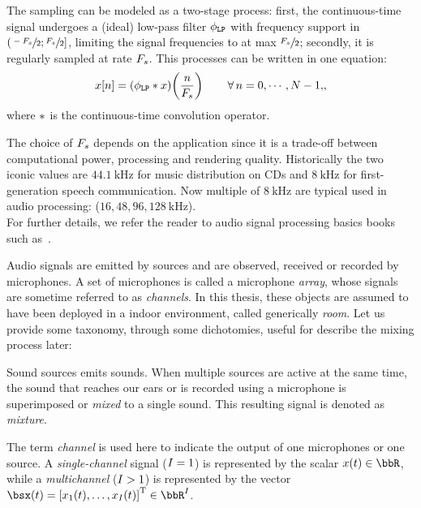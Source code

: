 The sampling can be modeled as a two-stage process:
first, the continuous-time signal undergoes a (ideal) low-pass filter $\phi_\mathtt{LP}$ with frequency support in $\kintervoc{\sfrac{-\Fs}{2}}{\sfrac{\Fs}{2}}$, limiting the signal frequencies to at max $\sfrac{F_s}{2}$;
secondly, it is regularly sampled at rate $F_s$.
This processes can be written in one equation:
\begin{equation}
    x[n] = (\lowpassfilter \conv x)\kparen{\frac{n}{\Fs}}
    \mathspace
    \kforall[n = 0, \cdots, N-1]
    ,
\end{equation}
where $\ast$ is the continuous-time convolution operator.

The choice of $F_s$ depends on the application since it is a trade-off between computational power, processing and rendering quality.
Historically the two iconic values are $\SI{44.1}{\kHz}$ for music distribution on CDs and $\SI{8}{\kHz}$ for first-generation speech communication.
Now multiple of $\SI{8}{\kHz}$ are typical used in audio processing: ($16, 48, 96, \SI{128}{\kHz}$).
\\For further details, we refer the reader to audio signal processing basics books such as~.

\mynewline
Audio signals are emitted by sources and are observed, received or recorded by microphones.
A set of microphones is called a microphone \textit{array}, whose signals are sometime referred to as \textit{channels}.
In this thesis, these objects are assumed to have been deployed in a indoor environment, called generically \textit{room}.
Let us provide some taxonomy, through some dichotomies, useful for describe the mixing process later:

Sound sources emits sounds.
When multiple sources are active at the same time, the sound that reaches our ears or is recorded using a microphone is superimposed or \textit{mixed} to a single sound.
This resulting signal is denoted as \textit{mixture}.

The term \textit{channel} is used here to indicate the output of one microphones or one source.
A \textit{single-channel} signal ($I = 1$) is represented by the scalar $\mic(t) \in \R$,
while a \textit{multichannel} ($I >   1$) is represented by the vector $\mics(t) = \ktranspose{\klist{\mic_1(t), \dots, \mic_{\numMics}(t)}} \in \R^{\numMics}$.

